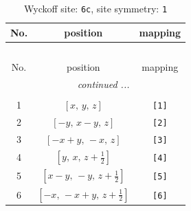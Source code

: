 \documentclass[fleqn,8pt]{jsarticle}
\begin{document}
\renewcommand{\arraystretch}{1.2}
\begin{longtable}{ccc}
\caption{Wyckoff site: {\tt 6c}, site symmetry: {\tt 1}}
 \\
 \hline \hline
No. & position & mapping \\ \hline \endfirsthead

\multicolumn{2}{l}{\tablename\ \thetable{}} \\
 \hline \hline
No. & position & mapping \\ \hline \endhead

 \hline \hline
\multicolumn{2}{r}{\footnotesize\it continued ...} \\ \endfoot

 \hline \hline
\multicolumn{2}{r}{} \\ \endlastfoot

1 & $\left[ x,\, y,\, z \right]$ & {\tt [1]} \\ \hline
2 & $\left[ - y,\, x - y,\, z \right]$ & {\tt [2]} \\ \hline
3 & $\left[ - x + y,\, - x,\, z \right]$ & {\tt [3]} \\ \hline
4 & $\left[ y,\, x,\, z + \frac{1}{2} \right]$ & {\tt [4]} \\ \hline
5 & $\left[ x - y,\, - y,\, z + \frac{1}{2} \right]$ & {\tt [5]} \\ \hline
6 & $\left[ - x,\, - x + y,\, z + \frac{1}{2} \right]$ & {\tt [6]} \\
\end{longtable}
\end{document}
